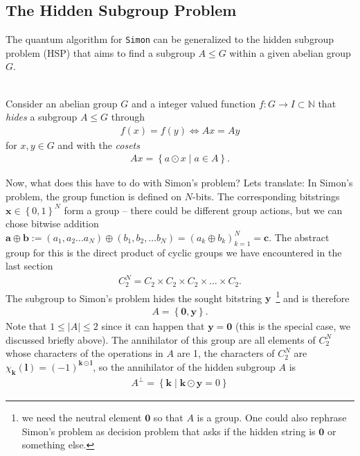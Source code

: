 \subsection{The Hidden Subgroup Problem}
The quantum algorithm for \texttt{Simon} can be generalized to the hidden subgroup problem (HSP) that aims to find a subgroup $A\leq G$ within a given abelian group $G$.
\begin{def*}\phantom{...}\\
Consider an abelian group $G$ and a integer valued function $f:G\rightarrow I\subset \mathbb{N}$ that \textit{hides} a subgroup $A\leq G$ through
\begin{align}
    f(x)=f(y) \Leftrightarrow Ax=Ay 
\end{align}
for $x,y\in G$ and with the \textit{cosets}
\begin{align}
    Ax = \left\{a\odot x \;|\; a\in A\right\}.
\end{align}
\end{def*}Now, what does this have to do with Simon's problem? Lets translate:
In Simon's problem, the group function is defined on $N$-bits. The corresponding bitstrings $\mathbf{x}\in\left\{0,1\right\}^N$ form a group -- there could be different group actions, but we can chose bitwise addition $\mathbf{a}\oplus\mathbf{b}:=(a_1,a_2\dots a_N)\oplus(b_1,b_2,\dots b_N)=(a_k\oplus b_k)_{k=1}^N = \mathbf{c}$. The abstract group for this is the direct product of cyclic groups we have encountered in the last section
\begin{align}
    C^N_{2} = C_2 \times C_2 \times C_2 \times \dots \times C_2.
\end{align}
The subgroup to Simon's problem hides the sought bitstring $\mathbf{y}$~\footnote{we need the neutral element $\mathbf{0}$ so that $A$ is a group. One could also rephrase Simon's problem as decision problem that asks if the hidden string is $\mathbf{0}$ or something else.} and is therefore 
\begin{align}
    A=\left\{\mathbf{0},\mathbf{y}\right\}.
\end{align}
Note that $1\leq |A| \leq 2$ since it can happen that $\mathbf{y}=\mathbf{0}$ (this is the special case, we discussed briefly above). 
The annihilator of this group are all elements of $C^N_2$ whose characters of the operations in $A$ are 1, the characters of $C^N_2$ are $\chi_\mathbf{k}(\mathbf{l})= (-1)^{\mathbf{k}\odot \mathbf{l}}$, so the annihilator of the hidden subgroup $A$ is 
\begin{align}
    A^\perp = \left\{\mathbf{k} \;|\; \mathbf{k}\odot \mathbf{y} = 0\right\}
\end{align}
